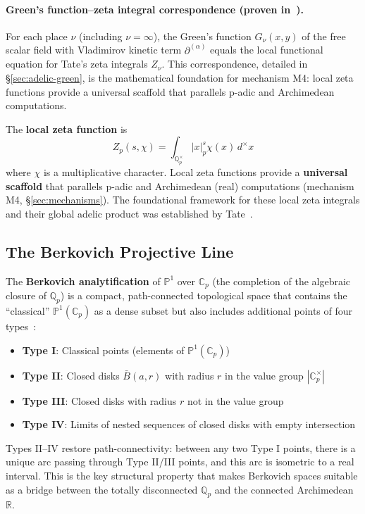 \documentclass[11pt,a4paper]{article}
\newcommand{\Qp}{\mathbb{Q}_p}
\newcommand{\R}{\mathbb{R}}
\newcommand{\Cp}{\mathbb{C}_p}
\newcommand{\Pone}{\mathbb{P}^1}
\newcommand{\dpartial}{\partial^{(\alpha)}}
\newcommand{\normp}[1]{|#1|_p}
\begin{document}
\paragraph{Green's function--zeta integral correspondence (proven in~\cite{HSYZ20}).}
For each place $\nu$ (including $\nu = \infty$), the Green's function $G_\nu(x,y)$ of the free scalar field with Vladimirov kinetic term $\dpartial$ equals the local functional equation for Tate's zeta integrals $Z_\nu$. This correspondence, detailed in \S\ref{sec:adelic-green}, is the mathematical foundation for mechanism M4: local zeta functions provide a universal scaffold that parallels p-adic and Archimedean computations.

The \textbf{local zeta function} is
\begin{equation}
Z_p(s, \chi) = \int_{\Qp^\times} \normp{x}^s \chi(x) \, d^\times x
\end{equation}
where $\chi$ is a multiplicative character. Local zeta functions provide a \textbf{universal scaffold} that parallels p-adic and Archimedean (real) computations (mechanism M4, \S\ref{sec:mechanisms}). The foundational framework for these local zeta integrals and their global adelic product was established by Tate~\cite{Tate50}.

\subsection{The Berkovich Projective Line}

The \textbf{Berkovich analytification} of $\Pone$ over $\Cp$ (the completion of the algebraic closure of $\Qp$) is a compact, path-connected topological space that contains the ``classical'' $\Pone(\Cp)$ as a dense subset but also includes additional points of four types~\cite{Ber90}:
\begin{itemize}[leftmargin=2em]
    \item \textbf{Type I}: Classical points (elements of $\Pone(\Cp)$)
    \item \textbf{Type II}: Closed disks $\bar{B}(a, r)$ with radius $r$ in the value group $|\Cp^\times|$
    \item \textbf{Type III}: Closed disks with radius $r$ not in the value group
    \item \textbf{Type IV}: Limits of nested sequences of closed disks with empty intersection
\end{itemize}
Types II--IV restore path-connectivity: between any two Type I points, there is a unique arc passing through Type II/III points, and this arc is isometric to a real interval. This is the key structural property that makes Berkovich spaces suitable as a bridge between the totally disconnected $\Qp$ and the connected Archimedean $\R$.
\end{document}
